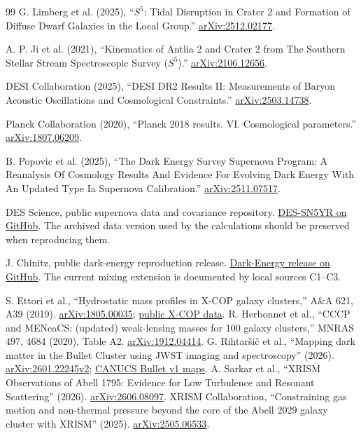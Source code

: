 \begin{thebibliography}{99}
 G. Limberg et al. (2025),
``$S^5$: Tidal Disruption in Crater 2 and Formation of Diffuse Dwarf
Galaxies in the Local Group.''
\href{https://arxiv.org/abs/2512.02177}{arXiv:2512.02177}.

 A. P. Ji et al. (2021),
``Kinematics of Antlia 2 and Crater 2 from The Southern Stellar Stream
Spectroscopic Survey ($S^5$).''
\href{https://arxiv.org/abs/2106.12656}{arXiv:2106.12656}.

 DESI Collaboration (2025),
``DESI DR2 Results II: Measurements of Baryon Acoustic Oscillations and
Cosmological Constraints.''
\href{https://arxiv.org/abs/2503.14738}{arXiv:2503.14738}.

 Planck Collaboration (2020),
``Planck 2018 results. VI. Cosmological parameters.''
\href{https://arxiv.org/abs/1807.06209}{arXiv:1807.06209}.

 B. Popovic et al. (2025),
``The Dark Energy Survey Supernova Program: A Reanalysis Of Cosmology
Results And Evidence For Evolving Dark Energy With An Updated Type Ia
Supernova Calibration.''
\href{https://arxiv.org/abs/2511.07517}{arXiv:2511.07517}.

 DES Science, public supernova data and covariance
repository. \href{https://github.com/des-science/DES-SN5YR}{DES-SN5YR on
GitHub}. The archived data version used by the calculations should be
preserved when reproducing them.

 J. Chinitz, public dark-energy reproduction release.
\href{https://github.com/jakechinitz/dark-energy/releases/tag/Dark-Energy}
{Dark-Energy release on GitHub}. The current mixing extension is
documented by local sources C1--C3.


 S. Ettori et al., ``Hydrostatic mass profiles in X-COP galaxy clusters,'' A\&A 621, A39 (2019).
\href{https://arxiv.org/abs/1805.00035}{arXiv:1805.00035};
\href{https://dominiqueeckert.wixsite.com/xcop/data}{public X-COP data}.
 R. Herbonnet et al., ``CCCP and MENeaCS: (updated) weak-lensing masses for 100 galaxy clusters,'' MNRAS 497, 4684 (2020), Table A2.
\href{https://arxiv.org/abs/1912.04414}{arXiv:1912.04414}.
 G. Rihtar\v{s}i\v{c} et al., ``Mapping dark matter in the Bullet Cluster using JWST imaging and spectroscopy'' (2026).
\href{https://arxiv.org/html/2601.22245v2}{arXiv:2601.22245v2};
\href{https://niriss.github.io/lensing.html}{CANUCS Bullet v1 maps}.
 A. Sarkar et al., ``XRISM Observations of Abell 1795: Evidence for Low Turbulence and Resonant Scattering'' (2026).
\href{https://arxiv.org/abs/2606.08097}{arXiv:2606.08097}.
 XRISM Collaboration, ``Constraining gas motion and non-thermal pressure beyond the core of the Abell 2029 galaxy cluster with XRISM'' (2025).
\href{https://arxiv.org/abs/2505.06533}{arXiv:2505.06533}.

\end{thebibliography}
